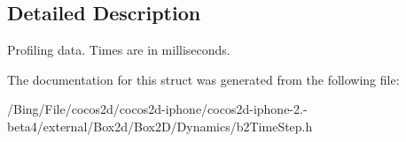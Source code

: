 \subsection{Detailed Description}
Profiling data. Times are in milliseconds. 

The documentation for this struct was generated from the following file\-:\begin{DoxyCompactItemize}
\item 
/\-Bing/\-File/cocos2d/cocos2d-\/iphone/cocos2d-\/iphone-\/2.-\/beta4/external/\-Box2d/\-Box2\-D/\-Dynamics/b2\-Time\-Step.\-h\end{DoxyCompactItemize}
